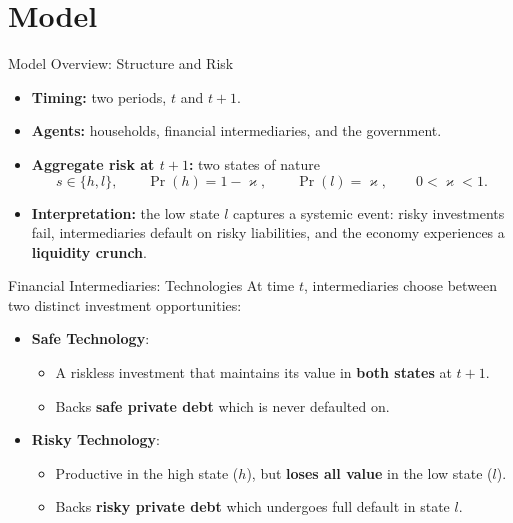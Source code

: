\documentclass[11pt,aspectratio=169]{beamer}
\begin{document}
\section{Model}
\begin{frame}{Model Overview: Structure and Risk}
\small
\begin{itemize}
  \item \textbf{Timing:} two periods, $t$ and $t+1$.
  \vspace{0.15em}
  \item \textbf{Agents:} households, financial intermediaries, and the government.
  \vspace{0.35em}
  \item \textbf{Aggregate risk at $t+1$:} two states of nature
  \[
    s\in\{h,l\},\qquad
    \Pr(h)=1-\varkappa,\qquad
    \Pr(l)=\varkappa,\qquad
    0<\varkappa<1.
  \]
  \vspace{0.2em}
  \item \textbf{Interpretation:} the low state $l$ captures a systemic event:
  risky investments fail, intermediaries default on risky liabilities, and the economy experiences a \textbf{liquidity crunch}.
\end{itemize}
\end{frame}

\begin{frame}{Financial Intermediaries: Technologies}
\small
At time $t$, intermediaries choose between two distinct investment opportunities:

\vspace{0.3cm}
\begin{itemize}
  \item \textbf{Safe Technology}:
  \begin{itemize}
    \item A riskless investment that maintains its value in \textbf{both states} at $t+1$.
    \item Backs \textbf{safe private debt} which is never defaulted on.
  \end{itemize}
  \vspace{0.4cm}
  \item \textbf{Risky Technology}:
  \begin{itemize}
    \item Productive in the high state ($h$), but \textbf{loses all value} in the low state ($l$).
    \item Backs \textbf{risky private debt} which undergoes full default in state $l$.
  \end{itemize}
\end{itemize}

\end{frame}
\end{document}

